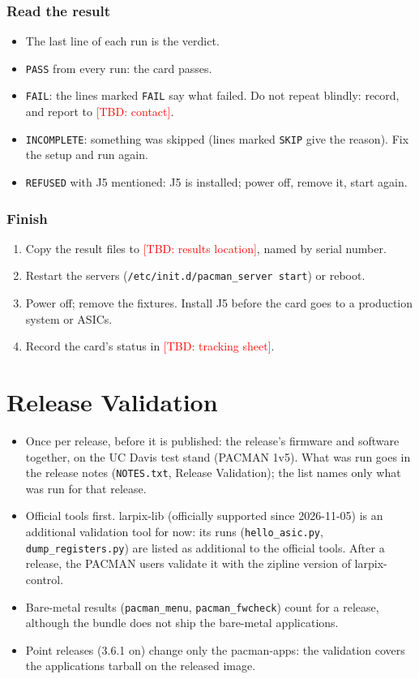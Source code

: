 \documentclass[11pt]{article}
\newcommand{\tbd}[1]{\textcolor{red}{[TBD: #1]}}
\begin{document}
\subsubsection*{Read the result}
\begin{itemize}
\item The last line of each run is the verdict.
\item \texttt{PASS} from every run: the card passes.
\item \texttt{FAIL}: the lines marked \texttt{FAIL} say what failed.  Do not repeat blindly: record, and report to
  \tbd{contact}.
\item \texttt{INCOMPLETE}: something was skipped (lines marked \texttt{SKIP} give the reason).  Fix the setup
  and run again.
\item \texttt{REFUSED} with J5 mentioned: J5 is installed; power off, remove it, start again.
\end{itemize}

\subsubsection*{Finish}
\begin{enumerate}
\item Copy the result files to \tbd{results location}, named by serial number.
\item Restart the servers (\texttt{/etc/init.d/pacman\_server start}) or reboot.
\item Power off; remove the fixtures.  Install J5 before the card goes to a production system or ASICs.
\item Record the card's status in \tbd{tracking sheet}.
\end{enumerate}

\section{Release Validation}\label{sec:release}

\begin{itemize}
\item Once per release, before it is published:  the release's firmware and software together, on the UC Davis
  test stand (PACMAN 1v5).  What was run goes in the release notes (\texttt{NOTES.txt}, Release Validation);  the
  list names only what was run for that release.
\item Official tools first.  larpix-lib (officially supported since 2026-11-05) is an additional validation tool for
  now:  its runs (\texttt{hello\_asic.py}, \texttt{dump\_registers.py}) are listed as additional to the official
  tools.  After a release, the PACMAN users validate it with the zipline version of larpix-control.
\item Bare-metal results (\texttt{pacman\_menu}, \texttt{pacman\_fwcheck}) count for a release, although the
  bundle does not ship the bare-metal applications.
\item Point releases (3.6.1 on) change only the pacman-apps:  the validation covers the applications tarball on
  the released image.
\end{itemize}
\end{document}
